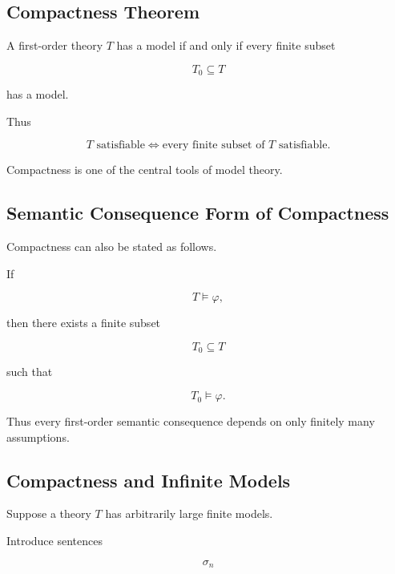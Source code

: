 \subsection{Compactness Theorem}
\label{subsec:model-theory-compactness}

\begin{theorem}
A first-order theory \(T\) has a model if and only if every finite subset

\[
T_0\subseteq T
\]

has a model.
\end{theorem}

Thus

\[
\boxed{
T
\text{ satisfiable}
\iff
\text{every finite subset of }T
\text{ satisfiable}.
}
\]

Compactness is one of the central tools of model theory.

\subsection{Semantic Consequence Form of Compactness}
\label{subsec:compactness-consequence-form}

Compactness can also be stated as follows.

If

\[
T\models\varphi,
\]

then there exists a finite subset

\[
T_0\subseteq T
\]

such that

\[
\boxed{
T_0\models\varphi.
}
\]

Thus every first-order semantic consequence depends on only finitely many
assumptions.

\subsection{Compactness and Infinite Models}
\label{subsec:compactness-infinite-models}

Suppose a theory \(T\) has arbitrarily large finite models.

Introduce sentences

\[
\sigma_n
\]

